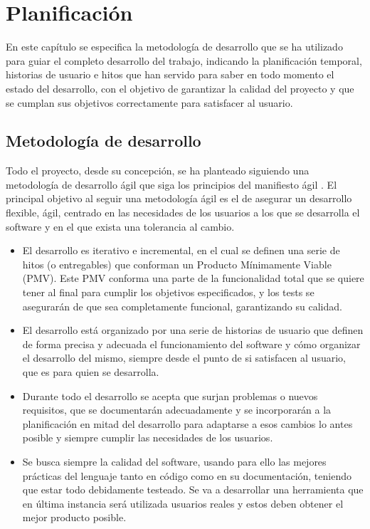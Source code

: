 \chapter{Planificación}
En este capítulo se especifica la metodología de desarrollo que se ha utilizado para guiar el completo desarrollo del trabajo, indicando la planificación temporal, historias de usuario e hitos que han servido para saber en todo momento el estado del desarrollo, con el objetivo de garantizar la calidad del proyecto y que se cumplan sus objetivos correctamente para satisfacer al usuario.

\section{Metodología de desarrollo}
Todo el proyecto, desde su concepción, se ha planteado siguiendo una metodología de desarrollo ágil que siga los principios del manifiesto ágil \cite{agilemanifesto}. El principal objetivo al seguir una metodología ágil es el de asegurar un desarrollo flexible, ágil, centrado en las necesidades de los usuarios a los que se desarrolla el software y en el que exista una tolerancia al cambio.

\begin{itemize}
    \item El desarrollo es iterativo e incremental, en el cual se definen una serie de hitos (o entregables) que conforman un Producto Mínimamente Viable (PMV). Este PMV conforma una parte de la funcionalidad total que se quiere tener al final para cumplir los objetivos especificados, y los tests se asegurarán de que sea completamente funcional, garantizando su calidad.
    \item El desarrollo está organizado por una serie de historias de usuario que definen de forma precisa y adecuada el funcionamiento del software y cómo organizar el desarrollo del mismo, siempre desde el punto de si satisfacen al usuario, que es para quien se desarrolla.
    \item Durante todo el desarrollo se acepta que surjan problemas o nuevos requisitos, que se documentarán adecuadamente y se incorporarán a la planificación en mitad del desarrollo para adaptarse a esos cambios lo antes posible y siempre cumplir las necesidades de los usuarios.
    \item Se busca siempre la calidad del software, usando para ello las mejores prácticas del lenguaje tanto en código como en su documentación, teniendo que estar todo debidamente testeado. Se va a desarrollar una herramienta que en última instancia será utilizada usuarios reales y estos deben obtener el mejor producto posible.
\end{itemize}

